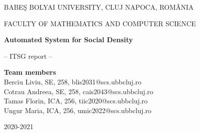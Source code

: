 \documentclass[runningheads,a4paper,11pt]{report}
\begin{document}
\begin{titlepage}
\sloppy

\begin{center}
BABE\c S BOLYAI UNIVERSITY, CLUJ NAPOCA, ROM\^ ANIA

FACULTY OF MATHEMATICS AND COMPUTER SCIENCE

\vspace{6cm}

\Huge \textbf{Automated System for Social Density}

\vspace{1cm}

\normalsize -- ITSG report --

\end{center}


\vspace{5cm}

\begin{flushright}
\Large{\textbf{Team members}}\\
Berciu Liviu, SE, 258, blis2031@scs.ubbcluj.ro \\
Cotrau Andreea, SE, 258, cais2043@scs.ubbcluj.ro \\
Tamas Florin, ICA, 256, tiic2020@scs.ubbcluj.ro \\
Ungur Maria, ICA, 256, umic2022@scs.ubbcluj.ro \\
\end{flushright}

\vspace{4cm}

\begin{center}
2020-2021
\end{center}

\end{titlepage}

\end{document}
